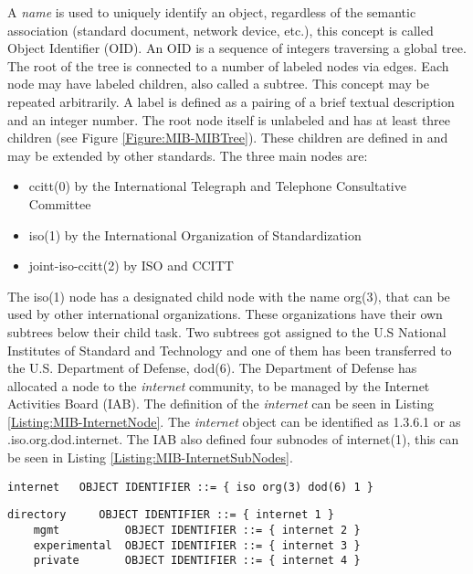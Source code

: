 A \textit{name} is used to uniquely identify an object, regardless of the semantic association (standard document, network device, etc.), this concept is called Object Identifier (OID). An OID is a sequence of integers traversing a global tree. The root of the tree is connected to a number of labeled nodes via edges. Each node may have labeled children, also called a subtree. This concept may be repeated arbitrarily. A label is defined as a pairing of a brief textual description and an integer number. The root node itself is unlabeled and has at least three children (see Figure \ref{Figure:MIB-MIBTree}). These children are defined in \cite{RFC:RFC1155:1990} and may be extended by other standards. The three main nodes are:

\begin{minipage}{\textwidth}
\begin{itemize}
    \item ccitt(0) by the International Telegraph and Telephone Consultative Committee
    \item iso(1) by the International Organization of Standardization
    \item joint-iso-ccitt(2) by ISO and CCITT
\end{itemize}
\end{minipage}


The iso(1) node has a designated child node with the name org(3), that can be used by other international organizations. These organizations have their own subtrees below their child task. Two subtrees got assigned to the U.S National Institutes of Standard and Technology and one of them has been transferred to the U.S. Department of Defense, dod(6). The Department of Defense has allocated a node to the \textit{internet} community, to be managed by the Internet Activities Board (IAB). The definition of the \textit{internet} can be seen in Listing \ref{Listing:MIB-InternetNode}. The \textit{internet} object can be identified as 1.3.6.1 or as .iso.org.dod.internet. The IAB also defined four subnodes of internet(1), this can be seen in Listing \ref{Listing:MIB-InternetSubNodes}.

\begin{lstlisting}[label=Listing:MIB-InternetNode,captionpos=b,caption={Definition of a node, internet node used as an example (from \cite{RFC:RFC1155:1990})}]
    internet   OBJECT IDENTIFIER ::= { iso org(3) dod(6) 1 }
\end{lstlisting}

\begin{lstlisting}[label=Listing:MIB-InternetSubNodes,captionpos=b,caption={Definition of subnodes, internet subnodes used as an example (from \cite{RFC:RFC1155:1990})}]
    directory     OBJECT IDENTIFIER ::= { internet 1 }
    mgmt          OBJECT IDENTIFIER ::= { internet 2 }
    experimental  OBJECT IDENTIFIER ::= { internet 3 }
    private       OBJECT IDENTIFIER ::= { internet 4 }
\end{lstlisting}


